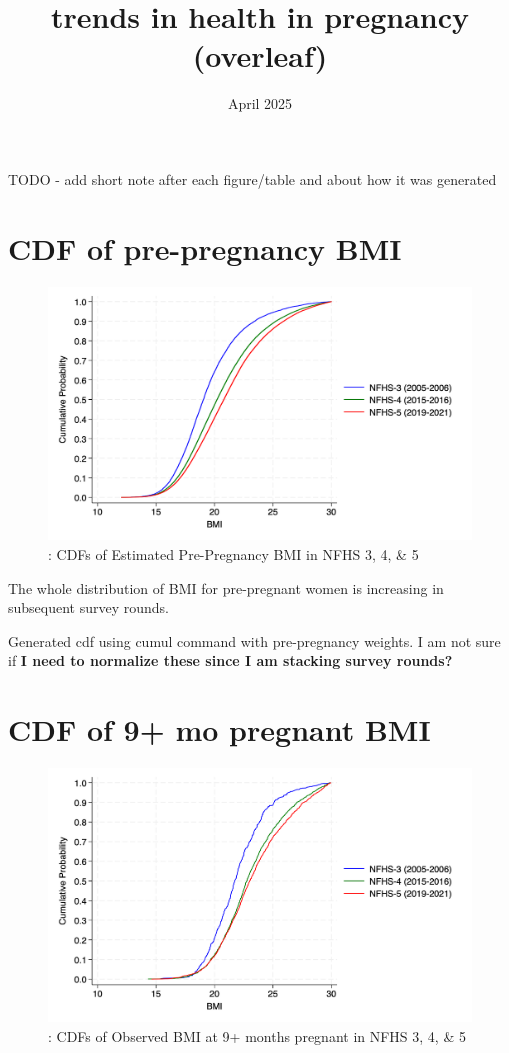 \documentclass{article}
\title{trends in health in pregnancy (overleaf)}
\date{April 2025}
\begin{document}
\maketitle

TODO
- add short note after each figure/table and about how it was generated

\section{CDF of pre-pregnancy BMI}

\begin{figure}[H]
    \centering
    \includegraphics[width=\textwidth]{figures/cdf prepregnancy bmi.png}
    \caption{: CDFs of Estimated Pre-Pregnancy BMI in NFHS 3, 4, \& 5}
    
\end{figure}

The whole distribution of BMI for pre-pregnant women is increasing in subsequent survey rounds. 

Generated cdf using cumul command with pre-pregnancy weights. I am not sure if \textbf{I need to normalize these since I am stacking survey rounds?}

\section{CDF of 9+ mo pregnant BMI}

\begin{figure}[H]
    \centering
    \includegraphics[width=\textwidth]{figures/cdf nine months bmi.png}
    \caption{: CDFs of Observed BMI at 9+ months pregnant in NFHS 3, 4, \& 5}
    
\end{figure}
\end{document}
